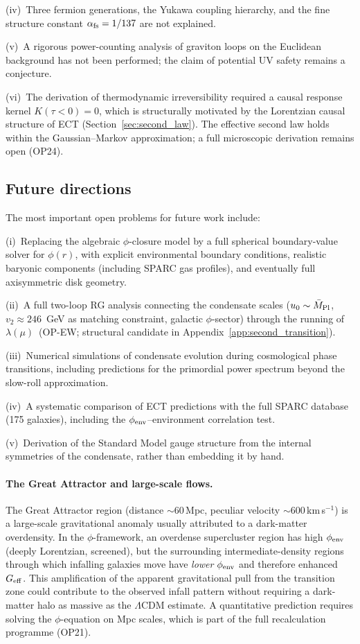 \documentclass[11pt,a4paper]{article}
\numberwithin{equation}{section}
\begin{document}
(iv)~Three fermion generations, the Yukawa coupling hierarchy, and
the fine structure constant $\alpha_{\rm fs} = 1/137$ are not
explained.

(v)~A rigorous power-counting analysis of graviton loops on the
Euclidean background has not been performed; the claim of potential
UV safety remains a conjecture.

(vi)~The derivation of thermodynamic irreversibility required a
causal response kernel $K(\tau < 0) = 0$, which is structurally motivated
by the Lorentzian causal structure of ECT (Section~\ref{sec:second_law}).
The effective second law holds within the Gaussian--Markov approximation;
a full microscopic derivation remains open (OP24).

\subsection{Future directions}

The most important open problems for future work include:

(i)~Replacing the algebraic $\phi$-closure model by a full
spherical boundary-value solver for $\phi(r)$, with explicit
environmental boundary conditions, realistic baryonic
components (including SPARC gas profiles), and eventually
full axisymmetric disk geometry.

(ii)~A full two-loop RG analysis connecting the condensate
scales ($u_0 \sim \bar{M}_{\rm Pl}$, $v_2 \approx 246$~GeV as matching
constraint, galactic $\phi$-sector) through the running of
$\lambda(\mu)$~(OP-EW; structural candidate in Appendix~\ref{app:second_transition}).

(iii)~Numerical simulations of condensate evolution during cosmological
phase transitions, including predictions for the primordial power
spectrum beyond the slow-roll approximation.

(iv)~A systematic comparison of ECT predictions with the full SPARC
database (175 galaxies), including the $\phi_{\rm env}$--environment
correlation test.

(v)~Derivation of the Standard Model gauge structure from the internal
symmetries of the condensate, rather than embedding it by hand.

\paragraph{The Great Attractor and large-scale flows.}
The Great Attractor region (distance $\sim 60\,$Mpc,
peculiar velocity $\sim 600\,$km\,s$^{-1}$) is a
large-scale gravitational anomaly usually attributed to a
dark-matter overdensity.  In the $\phi$-framework, an
overdense supercluster region has high $\phi_{\rm env}$
(deeply Lorentzian, screened), but the surrounding
intermediate-density regions through which infalling
galaxies move have \emph{lower} $\phi_{\rm env}$ and
therefore enhanced $G_{\rm eff}$.  This amplification of
the apparent gravitational pull from the transition zone
could contribute to the observed infall pattern without
requiring a dark-matter halo as massive as the $\Lambda$CDM
estimate.  A quantitative prediction requires solving the
$\phi$-equation on Mpc scales, which is part of the
full recalculation programme (OP21).
\end{document}
